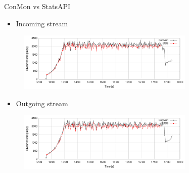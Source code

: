 \documentclass[first=red,second=purple,logo=yellowexc]{aaltoslides}
\begin{document}
\begin{frame}{ConMon vs StatsAPI}
\begin{itemize}
\item Incoming stream
\end{itemize}
\begin{figure}[h]
  \centering
  \includegraphics[width=0.75\textwidth]{p2p_incomming_cable_sample.pdf}
\end{figure}
\begin{itemize}
\item Outgoing stream
\end{itemize}
\begin{figure}[h]
  \centering
  \includegraphics[width=0.75\textwidth]{p2p_outgoing_cable_sample.pdf}
\end{figure}
\end{frame}

\end{document}
